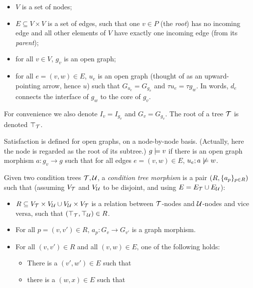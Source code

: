 \begin{itemize}
\item $V$ is a set of nodes;

\item $E\subseteq V\times V$ is a set of edges, such that one $v\in P$ (the \emph{root}) has no incoming edge and all other elements of $V$ have exactly one incoming edge (from its \emph{parent});

\item for all $v\in V$, $g_v$ is an open graph;

\item for all $e=(v,w)\in E$, $u_e$ is an open graph (thought of as an upward-pointing arrow, hence $u$) such that $G_{u_e}=G_{g_v}$ and $\tau u_e=\tau g_w$. In words, $d_e$ connects the interface of $g_w$ to the core of $g_v$. 
\end{itemize}
%
For convenience we also denote $I_v=I_{g_v}$ and $G_v=G_{g_v}$. The root of a tree ${\mathcal{T}}$ is denoted $\top_{{\mathcal{T}}}$.

\medskip\noindent Satisfaction is defined for open graphs, on a node-by-node basis. (Actually, here the node is regarded as the root of its subtree.) $g\models v$ if there is an open graph morphism $a:g_v\to g$ such that for all edges $e=(v,w)\in E$, $u_e;a\not\models w$.

\medskip\noindent
%
Given two condition trees ${\mathcal{T}},{\mathcal{U}}$, a \emph{condition tree morphism} is a pair $(R,\{{a_p}\}_{p\in R})$ such that (assuming $V_{\mathcal{T}}$ and $V_{\mathcal{U}}$ to be disjoint, and using $E=E_{\mathcal{T}}\cup E_{\mathcal{U}}$):

\begin{itemize}
\item $R\subseteq V_{\mathcal{T}}\times V_{\mathcal{U}}\cup V_{\mathcal{U}}\times V_{\mathcal{T}}$ is a relation between ${\mathcal{T}}$-nodes and ${\mathcal{U}}$-nodes and vice versa, such that $(\top_{{\mathcal{T}}},\top_{{\mathcal{U}}})\in R$.

\item For all $p=(v,v')\in R$, $a_p:G_v\to G_{v'}$ is a graph morphism.

\item For all $(v,v')\in R$ and all $(v,w)\in E$, one of the following holds:
\begin{itemize}
\item There is a $(v',w')\in E$ such that
\item there is a $(w,x)\in E$ such that
\end{itemize}
\end{itemize}
